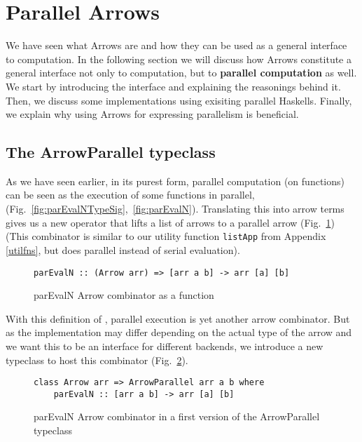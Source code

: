 \section{Parallel Arrows}
\label{sec:parallel-arrows}
We have seen what Arrows are and how they can be used as a general interface to computation. In the following section we will discuss how Arrows constitute a general interface not only to computation, but to \textbf{parallel computation} as well. We start by introducing the interface and explaining the reasonings behind it. Then, we discuss some implementations using exisiting parallel Haskells. Finally, we explain why using Arrows for expressing parallelism is beneficial.
\subsection{The ArrowParallel typeclass}
As we have seen earlier, in its purest form, parallel computation (on functions) can be seen as the execution of some functions  in parallel,  (Fig.~\ref{fig:parEvalNTypeSig},~\ref{fig:parEvalN}).
Translating this into arrow terms gives us a new operator  that lifts a list of arrows \code{[arr a b]} to a parallel arrow  (Fig.~\ref{fig:parEvalNArrowFn}) (This combinator is similar to our utility function \lstinline{listApp} from Appendix \ref{utilfns}, but does parallel instead of serial evaluation).
\begin{figure}[h]
\begin{lstlisting}[frame=htrbl]
parEvalN :: (Arrow arr) => [arr a b] -> arr [a] [b]
\end{lstlisting}
\caption{parEvalN Arrow combinator as a function}
\label{fig:parEvalNArrowFn}
\end{figure}
With this definition of , parallel execution is yet another arrow combinator. But as the implementation may differ depending on the actual type of the arrow  and we want this to be an interface for different backends, we introduce a new typeclass  to host this combinator (Fig.~\ref{fig:parEvalNArrowTypeClass1}).
\begin{figure}[h]
\begin{lstlisting}[frame=htrbl]
class Arrow arr => ArrowParallel arr a b where
	parEvalN :: [arr a b] -> arr [a] [b]
\end{lstlisting}
\caption{parEvalN Arrow combinator in a first version of the ArrowParallel typeclass}
\label{fig:parEvalNArrowTypeClass1}
\end{figure}

